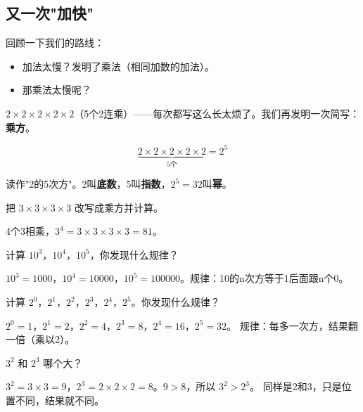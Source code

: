 

\subsection*{又一次"加快"}

回顾一下我们的路线：
\begin{itemize}
  \item 加法太慢？发明了乘法（相同加数的加法）。
  \item 那乘法太慢呢？
\end{itemize}

$2\times2\times2\times2\times2$（5个2连乘）——每次都写这么长太烦了。我们再发明一次简写：\textbf{乘方}。

\[
\underbrace{2\times2\times2\times2\times2}_{5\text{个}} = 2^5
\]

读作"2的5次方"。2叫\textbf{底数}，5叫\textbf{指数}，$2^5=32$叫\textbf{幂}。

\begin{example}
把 $3\times3\times3\times3$ 改写成乘方并计算。
\end{example}
\begin{solution}
4个3相乘，$3^4 = 3\times3\times3\times3 = 81$。
\end{solution}

\begin{example}
计算 $10^3$，$10^4$，$10^5$，你发现什么规律？
\end{example}
\begin{solution}
$10^3=1000$，$10^4=10000$，$10^5=100000$。规律：10的n次方等于1后面跟n个0。
\end{solution}

\begin{example}
计算 $2^0$，$2^1$，$2^2$，$2^3$，$2^4$，$2^5$。你发现什么规律？
\end{example}
\begin{solution}
$2^0=1$，$2^1=2$，$2^2=4$，$2^3=8$，$2^4=16$，$2^5=32$。
规律：每多一次方，结果翻一倍（乘以2）。
\end{solution}

\begin{example}
$3^2$ 和 $2^3$ 哪个大？
\end{example}
\begin{solution}
$3^2 = 3\times3 = 9$，$2^3 = 2\times2\times2 = 8$。$9>8$，所以 $3^2 > 2^3$。
同样是2和3，只是位置不同，结果就不同。
\end{solution}

